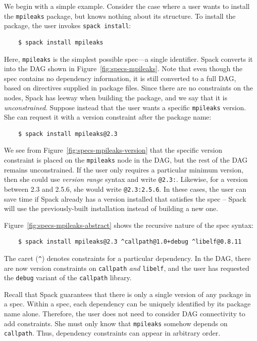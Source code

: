 We begin with a simple example.
Consider the case where a user wants to install the {\tt mpileaks} package, but knows
nothing about its structure.  To install the package, the user invokes {\tt spack install}:
%
\begin{verbatim}
    $ spack install mpileaks
\end{verbatim}
%
Here, {\tt mpileaks} is the simplest possible spec---a single identifier.
Spack converts it into the DAG shown in Figure~\ref{fig:specs-mpileaks}.
Note that even though the spec contains no dependency information, it is still
converted to a full DAG, based on directives supplied in package files. Since there
are no constraints on the nodes, Spack has leeway when building the
package, and we say that it is {\it unconstrained}.
%
Suppose instead that the user wants a specific {\tt mpileaks} version.
She can request it with a version constraint after the package name:
%
\begin{verbatim}
    $ spack install mpileaks@2.3
\end{verbatim}
%
We see from Figure~\ref{fig:specs-mpileaks-version} that the specific version constraint is
placed on the {\tt mpileaks} node in the DAG, but the rest of the DAG remains unconstrained.
If the user only requires a particular minimum version, then she could use
{\it version range} syntax
and write {\tt @2.3:}.  Likewise, for a version between 2.3 and 2.5.6, she would write
{\tt @2.3:2.5.6}. In these cases, the user can save time if
Spack already has a version installed that satisfies the spec -- Spack will use
the previously-built installation instead of building a new one.

Figure~\ref{fig:specs-mpileaks-abstract} shows the recursive nature of the spec syntax:
%
\begin{verbatim}
    $ spack install mpileaks@2.3 ^callpath@1.0+debug ^libelf@0.8.11
\end{verbatim}
%
The caret (\verb|^|) denotes constraints for a particular dependency.  In the DAG,
there are now version constraints on {\tt callpath} {\it and} {\tt libelf},
and the user has requested the {\tt debug} variant of the {\tt callpath} library.

Recall that Spack guarantees that there is only a single version of any package in
a spec.  Within a spec, each dependency can be uniquely
identified by its package name alone.  Therefore, the user does not need to consider 
DAG connectivity to add constraints.  She must only know that {\tt mpileaks}
somehow depends on {\tt callpath}.
Thus, dependency constraints can appear in arbitrary order.


